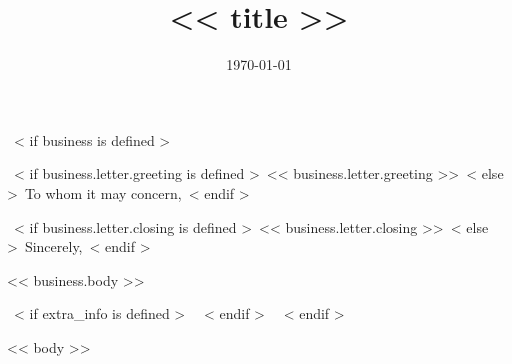 \documentclass[<< theme.font_size >>, << theme.font_type >>, << theme.paper_size >>]{moderncv}
\title{<< title >>}
\begin{document}
~< if business is defined >~
\date{\today}
\opening{~< if business.letter.greeting is defined >~<< business.letter.greeting >>~< else >~To whom it may concern,~< endif >~}
\closing{~< if business.letter.closing is defined >~<< business.letter.closing >>~< else >~Sincerely,~< endif >~}

\makeatletter
\let\@extrainfo\relax       %
\patchcmd{\makeletterhead}  %
  {\raggedright \@opening}  %
  {\@opening}               %
  {}{}                      %
\makeatother
\makelettertitle            %
<< business.body >>

\makeletterclosing          %
\newpage
\setcounter{page}{1}

  ~< if extra_info is defined >~
  ~< endif >~
~< endif >~


\makecvtitle
\vspace{-20pt}

<< body >>
\end{document}
